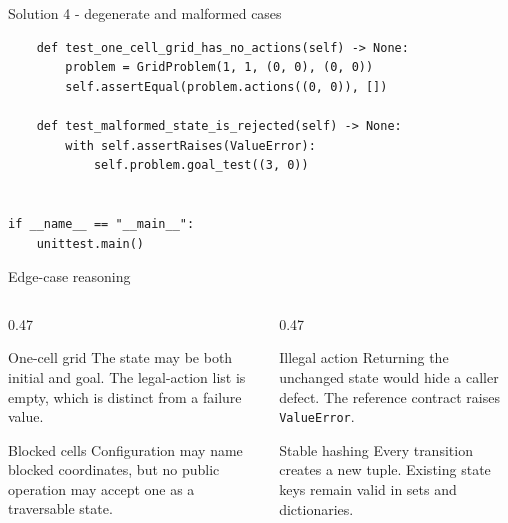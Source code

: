 \documentclass[aspectratio=169,11pt]{beamer}
\begin{document}
\begin{frame}[fragile]{Solution 4 - degenerate and malformed cases}
\begin{lstlisting}
    def test_one_cell_grid_has_no_actions(self) -> None:
        problem = GridProblem(1, 1, (0, 0), (0, 0))
        self.assertEqual(problem.actions((0, 0)), [])

    def test_malformed_state_is_rejected(self) -> None:
        with self.assertRaises(ValueError):
            self.problem.goal_test((3, 0))


if __name__ == "__main__":
    unittest.main()
\end{lstlisting}
\end{frame}

\begin{frame}{Edge-case reasoning}
  \begin{columns}[T,onlytextwidth]
    \begin{column}{0.47\textwidth}
      \begin{block}{One-cell grid}
        The state may be both initial and goal. The legal-action list is empty,
        which is distinct from a failure value.
      \end{block}
      \begin{block}{Blocked cells}
        Configuration may name blocked coordinates, but no public operation may
        accept one as a traversable state.
      \end{block}
    \end{column}
    \begin{column}{0.47\textwidth}
      \begin{block}{Illegal action}
        Returning the unchanged state would hide a caller defect. The reference
        contract raises \texttt{ValueError}.
      \end{block}
      \begin{block}{Stable hashing}
        Every transition creates a new tuple. Existing state keys remain valid
        in sets and dictionaries.
      \end{block}
    \end{column}
  \end{columns}
\end{frame}
\end{document}
